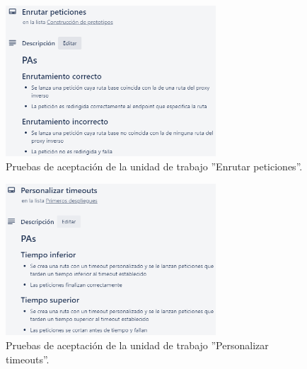 \documentclass[11pt,spanish,listoffigures]{tfgetsinf}
\begin{document}
\begin{figure}[H] %
\centering
\includegraphics[width=0.7\textwidth]{imagenes/PAsEnrutarPeticiones}
\caption{Pruebas de aceptación de la unidad de trabajo ''Enrutar peticiones''.}
	\label{PAsEnrutamiento}
\end{figure}

\begin{figure}[H] %
\centering
\includegraphics[width=0.7\textwidth]{imagenes/PAsPersonalizarTimeouts}
\caption{Pruebas de aceptación de la unidad de trabajo ''Personalizar timeouts''.}
	\label{PAsPersonalizacionTimeouts}
\end{figure}
\end{document}
